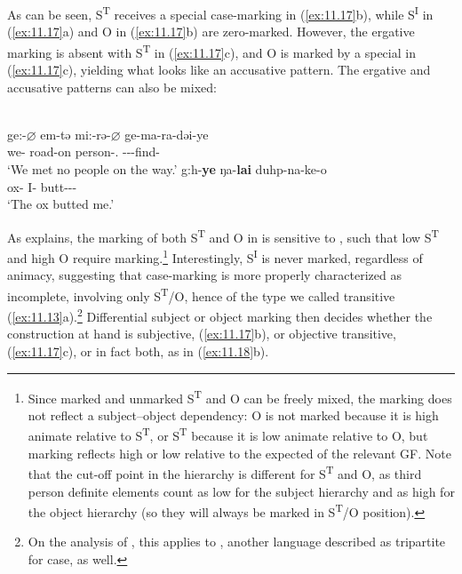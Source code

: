 \documentclass[output=paper]{langsci/langscibook}
\begin{document}
As can be seen, S\textsuperscript{T} receives a special case-marking in (\ref{ex:11.17}b),
while S\textsuperscript{I} in (\ref{ex:11.17}a) and O in (\ref{ex:11.17}b) are zero-marked. However,
the ergative marking is absent with S\textsuperscript{T} in (\ref{ex:11.17}c), and O is
marked by a special  in (\ref{ex:11.17}c), yielding what looks like an
accusative pattern. The ergative and accusative patterns can also be mixed:

\ea%
    \label{ex:11.18} \\
	\ea
		\gll ge:-\textbf{${\varnothing}$}    em-tə    mi:-rə-\textbf{${\varnothing}$}      ge-ma-ra-dəi-ye\\
			we-\Nom{}  road-on  person-\Pl.\Abs{} \Fpl-\Neg-\Tpl{}-find-\Ipfv{}\\
		\glt ‘We met no people on the way.’
	\ex
		\gll g:h-\textbf{ye}  ŋa-\textbf{lai}  duhp-na-ke-o\\
			ox-\Erg{}    I-\Acc{}  butt-\Fsg-\Pfv-\Tsg{}\\
		\glt ‘The ox butted me.’
	\z
\z

As \citet[69]{Watters2002} explains, the marking of both S\textsuperscript{T}
and O in  is sensitive to , such that low 
S\textsuperscript{T} and high  O require marking.\footnote{Since marked
and unmarked S\textsuperscript{T} and O can be freely mixed, the marking does
not reflect a subject--object dependency: O is not marked because it is high
animate relative to S\textsuperscript{T}, or S\textsuperscript{T} because it is
low animate relative to O, but marking reflects high or low  relative to
the expected  of the relevant \gls{GF}. Note that the cut-off point
in the  hierarchy is different for S\textsuperscript{T} and O, as third
person definite elements count as low for the subject hierarchy and as high for
the object hierarchy (so they will always be marked in S\textsuperscript{T}/O
position).} Interestingly, S\textsuperscript{I} is never marked, regardless of
animacy, suggesting that  case-marking is more properly characterized
as incomplete, involving only S\textsuperscript{T}/O, hence of the type we
called transitive (\ref{ex:11.13}a).\footnote{On the analysis of
\citet{Lindenbergh2015}, this applies to , another language
described as tripartite for case, as well.} Differential subject or object
marking then decides whether the construction at hand is subjective,
(\ref{ex:11.17}b), or objective transitive, (\ref{ex:11.17}c), or in
fact both, as in (\ref{ex:11.18}b).
\end{document}
